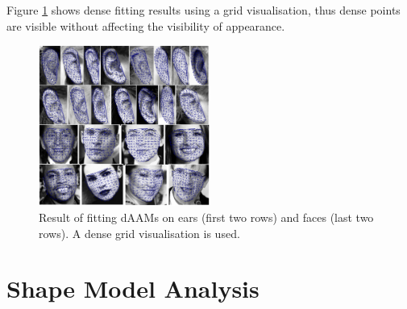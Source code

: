 Figure \ref{fig:fr} shows dense fitting results using a grid visualisation, thus dense points are visible without affecting the visibility of appearance.

\begin{figure}[!t]
\centering
\includegraphics[width=0.5\textwidth]{Suplementory_Meterial/Fittings/fittings}
\caption{Result of fitting dAAMs on ears (first two rows) and faces (last two rows). A dense grid visualisation is used.}
\label{fig:fr}
\end{figure}



\section{Shape Model Analysis}
\label{sec:modelanalysis}


